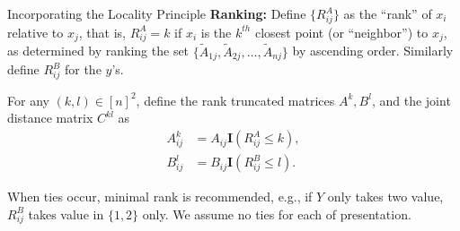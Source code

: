 \documentclass[mathserif,t]{beamer}
\newcommand{\G}{c}
\providecommand{\mb}[1]{\boldsymbol{#1}}
\newcommand{\mby}{Y}
\begin{document}

\begin{frame}{Incorporating the Locality Principle}
\pause
\textbf{Ranking:} Define $\{R^{A}_{ij}\}$ as the ``rank'' of $x_i$ relative to $x_j$, that is, $R^{A}_{ij}=k$ if $x_i$ is the $k^{th}$ closest point (or ``neighbor'') to $x_j$, as determined by ranking the set $\{\tilde{A}_{1j},\tilde{A}_{2j},\ldots,\tilde{A}_{nj}\}$ by ascending order. Similarly define $R^{B}_{ij}$ for the $y$'s. 

\pause
\medskip
For any $(k,l) \in [n]^2$, define the rank truncated matrices $A^{k}, B^{l}$, and the joint distance matrix $C^{kl}$ as
\begin{align*}
A_{ij}^{k} &=A_{ij} \mb{I}(R^{A}_{ij} \leq k), \\
B_{ij}^{l} &=B_{ij} \mb{I}(R^{B}_{ij} \leq l). 
\end{align*}

\pause
\medskip
When ties occur, minimal rank is recommended, e.g., if $\mby$ only takes two value, $R^{B}_{ij}$ takes value in $\{1,2\}$ only. We assume no ties for each of presentation.
\end{frame}
\end{document}

